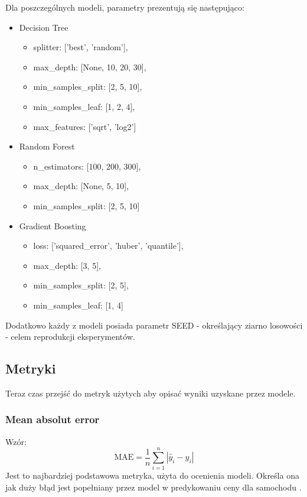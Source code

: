 \documentclass{article}
\begin{document}
Dla poszczególnych modeli, parametry prezentują się następująco:
\begin{itemize}
    \item Decision Tree
    \begin{itemize}
        \item splitter: ['best', 'random'],    
        \item max\_depth: [None, 10, 20, 30], 
        \item min\_samples\_split: [2, 5, 10],
        \item min\_samples\_leaf: [1, 2, 4],
        \item max\_features: ['sqrt', 'log2']
    \end{itemize}
    
    \item Random Forest
    \begin{itemize}
        \item n\_estimators: [100, 200, 300],
        \item max\_depth: [None, 5, 10],
        \item min\_samples\_split: [2, 5, 10] 
    \end{itemize}

    \item Gradient Boosting
    \begin{itemize}
        \item loss: ['squared\_error', 'huber', 'quantile'],
        \item max\_depth: [3, 5],
        \item min\_samples\_split: [2, 5],
        \item min\_samples\_leaf: [1, 4]
    \end{itemize}

\end{itemize}

Dodatkowo każdy z modeli posiada parametr SEED - określający ziarno losowości - celem reprodukcji eksperymentów.

\subsection{Metryki}
Teraz czas przejść do metryk użytych aby opisać wyniki uzyskane przez modele.

\subsubsection{Mean absolut error}
Wzór:
\[
\text{MAE} = \frac{1}{n} \sum_{i=1}^{n} |\hat{y}_i - y_i|
\]
Jest to najbardziej podstawowa metryka, użyta do ocenienia modeli. Określa ona jak duży błąd jest popełniany przez model w predykowaniu ceny dla samochodu \cite{mean_absolute_error}.
\end{document}
